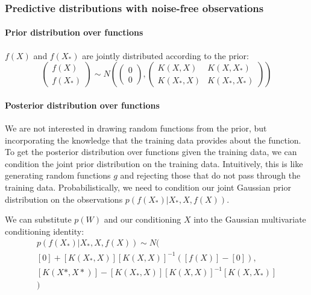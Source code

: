 \documentclass[10pt]{article}
\begin{document}
\subsubsection{Predictive distributions with noise-free observations}
\paragraph{Prior distribution over functions}
$f(X)$ and $f(X_*)$ are jointly distributed according to the prior:
\begin{equation*}
    \begin{pmatrix}
        f(X) \\ f(X_*)
    \end{pmatrix} \sim N\left(
    \begin{pmatrix}
        0 \\ 0
    \end{pmatrix},
    \begin{pmatrix}
        K(X,X) & K(X,X_*) \\ K(X_*,X) & K(X_*,X_*)
    \end{pmatrix}
    \right)
\end{equation*}

\paragraph{Posterior distribution over functions}
We are not interested in drawing random functions from the prior, but incorporating the knowledge that the training data provides about the function. To get the posterior distribution over functions given the training data, we can condition the joint prior distribution on the training data. Intuitively, this is like generating random functions $g$ and rejecting those that do not pass through the training data. Probabilistically, we need to condition our joint Gaussian prior distribution on the observations $p(f(X_*)|X_*, X, f(X))$.

We can substitute $p(W)$ and our conditioning $X$ into the Gaussian multivariate conditioning identity:
\begin{equation*}
    \begin{aligned}
        p(f(X_*)|X_*, X, f(X)) \sim N( \\
        [0] + [K(X_*,X)][K(X,X)]^{-1}([f(X)] - [0]), \\
        [K(X*,X*)] - [K(X_*,X)][K(X,X)]^{-1}[K(X,X_*)] \\
        )
    \end{aligned}
\end{equation*}
\end{document}
